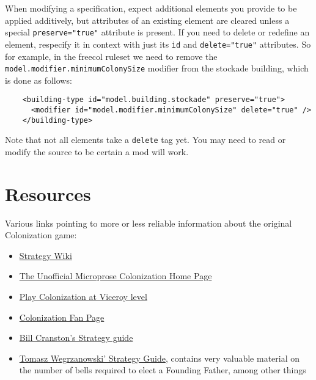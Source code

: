 \documentclass[12pt]{book}
\begin{document}
When modifying a specification, expect additional elements you provide
to be applied additively, but attributes of an existing element are
cleared unless a special \texttt{preserve="true"} attribute is
present.  If you need to delete or redefine an element, respecify it
in context with just its \texttt{id} and \texttt{delete="true"}
attributes.  So for example, in the freecol ruleset we need to remove
the \texttt{model.modifier.minimumColonySize} modifier from the
stockade building, which is done as follows:

\begin{verbatim}
    <building-type id="model.building.stockade" preserve="true">
      <modifier id="model.modifier.minimumColonySize" delete="true" />
    </building-type>
\end{verbatim}

Note that not all elements take a \texttt{delete} tag yet.  You may
need to read or modify the source to be certain a mod will work.


\hypertarget{Resources}{\chapter{Resources}}

Various links pointing to more or less reliable information about the
original Colonization game:

\begin{itemize}
\item \href{http://strategywiki.org/wiki/Sid_Meier%27s_Colonization}
  {Strategy Wiki}
\item \href{http://www.colonization.biz/}{The Unofficial Microprose
  Colonization Home Page}
\item \href{http://dledgard0.tripod.com/FAQs/play_col_at_viceroy.htm}
  {Play Colonization at Viceroy level}
\item \href{http://www.colonizationfans.com/}{Colonization Fan Page}
\item \href{http://www.ibiblio.org/GameBytes/issue21/misc/colstrat.html}
  {Bill Cranston's Strategy guide}
\item \href{http://civilization.wikia.com/wiki/Colonization_tips}
  {Tomasz Wegrzanowski' Strategy Guide}, contains very valuable
  material on the number of bells required to elect a Founding Father,
  among other things
\end{itemize}


\printindex
\end{document}
